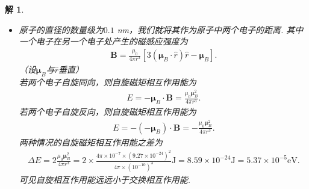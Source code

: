 \documentclass[UTF8,10pt,a4paper]{article}
\theoremstyle{Problem}
\theoremstyle{Solution}
\newtheorem*{sol}{解}
\providecommand{\abs}[1]{\left\lvert#1\right\rvert}
\begin{document}
\begin{sol}
\begin{itemize}
\begin{align}
\begin{array}{ll}
            \frac{1}{\sqrt{\frac{4\pi a^3}{3}}}=4.89\times 10^{14}\text{m}^{-3/2},&\abs{\bm{r}_1}\leq a=0.1\text{nm},\\
            0,&\text{otherwise}.
        \end{array}\right.
    \end{align}
    交换相互作用能为
    \begin{align}
        \Delta E=-\frac{1}{\left(\frac{4\pi a^3}{3}\right)^2}\int_{\text{atom}}\int_{\text{in atom}}d^3\bm{r}_1d^3\bm{r}_2\frac{e^2}{4\pi\varepsilon_0\abs{\bm{r}_1-\bm{r}_2}}.
    \end{align}
    方便起见，将积分式用含有$\abs{\bm{r}_1-\bm{r}_2}$的平均值的库仑势代替，我们近似认为两个电子间的距离的平均值为原子的半径，$\langle\abs{\bm{r}_1-\bm{r}_2}\rangle=0.1$ nm，故
    \begin{align}
        \nonumber\Delta E\approx&-\frac{1}{\left(\frac{4\pi a^3}{3}\right)^2}\left(\frac{4\pi a^3}{3}\right)^2\frac{e^2}{\langle\abs{\bm{r}_1-\bm{r}_2}\rangle}=-\frac{e^2}{\langle\abs{\bm{r}_1-\bm{r}_2}\rangle}\\
        \nonumber=&-\frac{(1.6\times 10^{-19})^2}{4\pi\times 8.85\times 10^{-12}\times 10^{-10}}\text{J}=-2.30\times 10^{-8}\text{J}=-14.4\text{eV}.
    \end{align}
    \item 原子的直径的数量级为$0.1$ nm，我们就将其作为原子中两个电子的距离. 其中一个电子在另一个电子处产生的磁感应强度为
    \begin{align}
        \bm{B}=\frac{\mu_0}{4\pi r^3}[3(\bm{\mu}_B\cdot\hat{r})\hat{r}-\bm{\mu}_B].
    \end{align}
    （设$\bm{\mu}_B$与$\hat{r}$垂直）\\
    若两个电子自旋同向，则自旋磁矩相互作用能为
    \begin{align}
        E=-\bm{\mu}_B\cdot\bm{B}=\frac{\mu_0\bm{\mu}_B^2}{4\pi r^3}.
    \end{align}
    若两个电子自旋反向，则自旋磁矩相互作用能为
    \begin{align}
        E=-(-\bm{\mu}_B)\cdot\bm{B}=-\frac{\mu_0\bm{\mu}_B^2}{4\pi r^3}.
    \end{align}
    两种情况的自旋磁矩相互作用能之差为
    \begin{align}
        \Delta E=2\frac{\mu_0\bm{\mu}_B^2}{4\pi r^3}=2\times\frac{4\pi\times 10^{-7}\times(9.27\times 10^{-24})^2}{4\pi\times(10^{-10})^3}\text{J}=8.59\times 10^{-24}\text{J}=5.37\times 10^{-5}\text{eV}.
    \end{align}
    可见自旋相互作用能远远小于交换相互作用能.
\end{itemize}
\end{sol}
\end{document}
